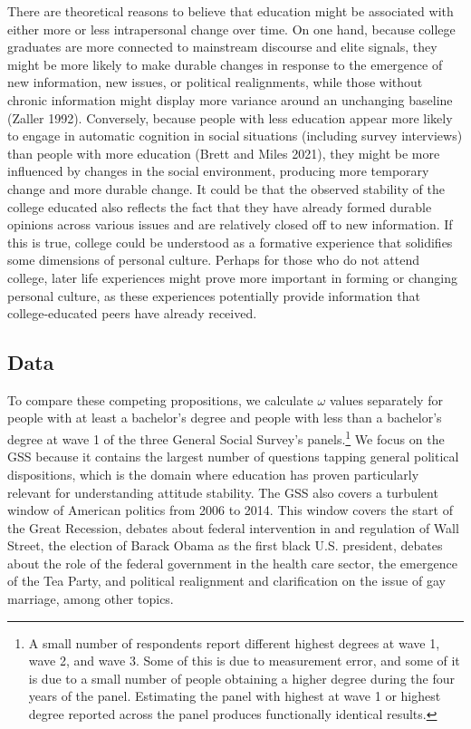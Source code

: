 \documentclass[
  12pt,
]{article}
\begin{document}
There are theoretical reasons to believe that education might be
associated with either more or less intrapersonal change over time. On
one hand, because college graduates are more connected to mainstream
discourse and elite signals, they might be more likely to make durable
changes in response to the emergence of new information, new issues, or
political realignments, while those without chronic information might
display more variance around an unchanging baseline (Zaller 1992).
Conversely, because people with less education appear more likely to
engage in automatic cognition in social situations (including survey
interviews) than people with more education (Brett and Miles 2021), they
might be more influenced by changes in the social environment, producing
more temporary change and more durable change. It could be that the
observed stability of the college educated also reflects the fact that
they have already formed durable opinions across various issues and are
relatively closed off to new information. If this is true, college could
be understood as a formative experience that solidifies some dimensions
of personal culture. Perhaps for those who do not attend college, later
life experiences might prove more important in forming or changing
personal culture, as these experiences potentially provide information
that college-educated peers have already received.

\hypertarget{data-1}{%
\subsection{Data}\label{data-1}}

To compare these competing propositions, we calculate \(\omega\) values
separately for people with at least a bachelor's degree and people with
less than a bachelor's degree at wave 1 of the three General Social
Survey's panels.\footnote{A small number of respondents report different
  highest degrees at wave 1, wave 2, and wave 3. Some of this is due to
  measurement error, and some of it is due to a small number of people
  obtaining a higher degree during the four years of the panel.
  Estimating the panel with highest at wave 1 or highest degree reported
  across the panel produces functionally identical results.} We focus on
the GSS because it contains the largest number of questions tapping
general political dispositions, which is the domain where education has
proven particularly relevant for understanding attitude stability. The
GSS also covers a turbulent window of American politics from 2006 to
2014. This window covers the start of the Great Recession, debates about
federal intervention in and regulation of Wall Street, the election of
Barack Obama as the first black U.S. president, debates about the role
of the federal government in the health care sector, the emergence of
the Tea Party, and political realignment and clarification on the issue
of gay marriage, among other topics.
\end{document}
